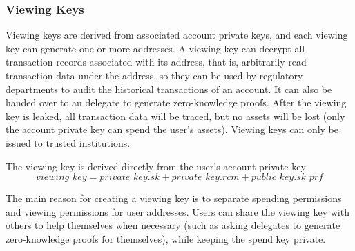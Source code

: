 \subsubsection{Viewing Keys}\label{section: viewing-keys}

Viewing keys are derived from associated account private keys, and each viewing key can generate one or more addresses. A viewing key can decrypt all transaction records associated with its address, that is, arbitrarily read transaction data under the address, so they can be used by regulatory departments to audit the historical transactions of an account. It can also be handed over to an delegate to generate zero-knowledge proofs. After the viewing key is leaked, all transaction data will be traced, but no assets will be lost (only the account private key can spend the user's assets). Viewing keys can only be issued to trusted institutions.

The viewing key is derived directly from the user's account private key
$$viewing\_key = private\_key.sk + private\_key.rcm + public\_key.sk\_prf$$

The main reason for creating a viewing key is to separate spending permissions and viewing permissions for user addresses. Users can share the viewing key with others to help themselves when necessary (such as asking delegates to generate zero-knowledge proofs for themselves), while keeping the spend key private.